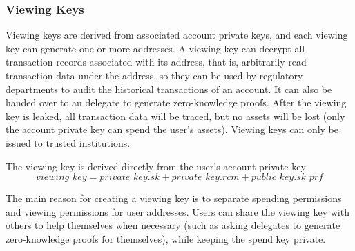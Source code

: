 \subsubsection{Viewing Keys}\label{section: viewing-keys}

Viewing keys are derived from associated account private keys, and each viewing key can generate one or more addresses. A viewing key can decrypt all transaction records associated with its address, that is, arbitrarily read transaction data under the address, so they can be used by regulatory departments to audit the historical transactions of an account. It can also be handed over to an delegate to generate zero-knowledge proofs. After the viewing key is leaked, all transaction data will be traced, but no assets will be lost (only the account private key can spend the user's assets). Viewing keys can only be issued to trusted institutions.

The viewing key is derived directly from the user's account private key
$$viewing\_key = private\_key.sk + private\_key.rcm + public\_key.sk\_prf$$

The main reason for creating a viewing key is to separate spending permissions and viewing permissions for user addresses. Users can share the viewing key with others to help themselves when necessary (such as asking delegates to generate zero-knowledge proofs for themselves), while keeping the spend key private.